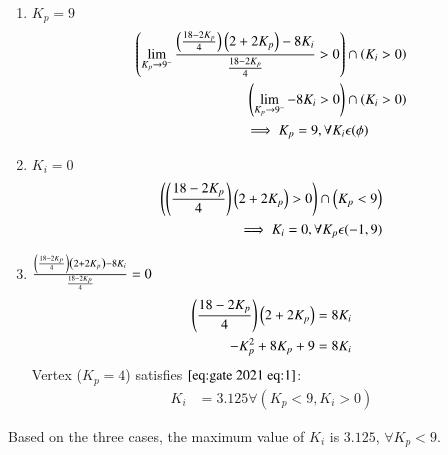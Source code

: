 \documentclass[journal,12pt,onecolumn]{IEEEtran}
\theoremstyle{remark}
\begin{document}
    \begin{enumerate}
        \item $K_p=9$\\
         \begin{align}
       \left(\lim_{K_p\to9^-} \frac{\left(\frac{18-2K_p}{4}\right)\left(2 + 2K_p\right)-8K_i}{\frac{18-2K_p}{4}} > 0\right) &\cap \left(K_i > 0\right)\\
       \left(\lim_{K_p\to9^-} -8K_i > 0\right) &\cap \left({K_i > 0}\right)\\
  \implies K_p=9 , \forall K_i &\epsilon (\phi)
    \end{align}
    \item  $K_i=0$\\
    \begin{align}
        \left(\left(\frac{18-2K_p}{4}\right)\left(2 + 2K_p\right) > 0\right)  \cap \left(K_p < 9\right)\\
        \implies K_i=0 , \forall K_p \epsilon (-1 , 9)
    \end{align}
    \item $\frac{\left(\frac{18-2K_p}{4}\right)\left(2 + 2K_p\right)-8K_i}{\frac{18-2K_p}{4}} = 0$\\
        \begin{align}
            \left(\frac{18-2K_p}{4}\right)\left(2 + 2K_p\right) = 8K_i\\
             -K_p^2 +8K_p + 9 = 8K_i
        \end{align}
        Vertex ($K_p=4$) satisfies $\eqref{eq:gate 2021 eq:1}$:
        \begin{align}
            K_i &= 3.125 \forall (K_p < 9,K_i>0)
        \end{align}
    \end{enumerate}
    Based on the three cases, the maximum value of $K_i$ is $3.125$, $\forall K_p < 9$.
   
    
\end{document}
